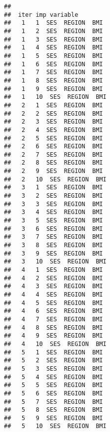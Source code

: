 \documentclass[
]{book}
\newenvironment{Shaded}{\begin{snugshade}}{\end{snugshade}}
\newcommand{\ControlFlowTok}[1]{\textcolor[rgb]{0.13,0.29,0.53}{\textbf{#1}}}
\newcommand{\DecValTok}[1]{\textcolor[rgb]{0.00,0.00,0.81}{#1}}
\newcommand{\DocumentationTok}[1]{\textcolor[rgb]{0.56,0.35,0.01}{\textbf{\textit{#1}}}}
\newcommand{\FunctionTok}[1]{\textcolor[rgb]{0.00,0.00,0.00}{#1}}
\newcommand{\NormalTok}[1]{#1}
\newcommand{\OtherTok}[1]{\textcolor[rgb]{0.56,0.35,0.01}{#1}}
\newcommand{\SpecialCharTok}[1]{\textcolor[rgb]{0.00,0.00,0.00}{#1}}
\newcommand{\StringTok}[1]{\textcolor[rgb]{0.31,0.60,0.02}{#1}}
\theoremstyle{definition}
\theoremstyle{definition}
\theoremstyle{definition}
\theoremstyle{definition}
\theoremstyle{remark}
\begin{document}
\begin{verbatim}
## 
##  iter imp variable
##   1   1  SES  REGION  BMI
##   1   2  SES  REGION  BMI
##   1   3  SES  REGION  BMI
##   1   4  SES  REGION  BMI
##   1   5  SES  REGION  BMI
##   1   6  SES  REGION  BMI
##   1   7  SES  REGION  BMI
##   1   8  SES  REGION  BMI
##   1   9  SES  REGION  BMI
##   1   10  SES  REGION  BMI
##   2   1  SES  REGION  BMI
##   2   2  SES  REGION  BMI
##   2   3  SES  REGION  BMI
##   2   4  SES  REGION  BMI
##   2   5  SES  REGION  BMI
##   2   6  SES  REGION  BMI
##   2   7  SES  REGION  BMI
##   2   8  SES  REGION  BMI
##   2   9  SES  REGION  BMI
##   2   10  SES  REGION  BMI
##   3   1  SES  REGION  BMI
##   3   2  SES  REGION  BMI
##   3   3  SES  REGION  BMI
##   3   4  SES  REGION  BMI
##   3   5  SES  REGION  BMI
##   3   6  SES  REGION  BMI
##   3   7  SES  REGION  BMI
##   3   8  SES  REGION  BMI
##   3   9  SES  REGION  BMI
##   3   10  SES  REGION  BMI
##   4   1  SES  REGION  BMI
##   4   2  SES  REGION  BMI
##   4   3  SES  REGION  BMI
##   4   4  SES  REGION  BMI
##   4   5  SES  REGION  BMI
##   4   6  SES  REGION  BMI
##   4   7  SES  REGION  BMI
##   4   8  SES  REGION  BMI
##   4   9  SES  REGION  BMI
##   4   10  SES  REGION  BMI
##   5   1  SES  REGION  BMI
##   5   2  SES  REGION  BMI
##   5   3  SES  REGION  BMI
##   5   4  SES  REGION  BMI
##   5   5  SES  REGION  BMI
##   5   6  SES  REGION  BMI
##   5   7  SES  REGION  BMI
##   5   8  SES  REGION  BMI
##   5   9  SES  REGION  BMI
##   5   10  SES  REGION  BMI
\end{verbatim}

\begin{Shaded}
\end{Shaded}
\end{document}
